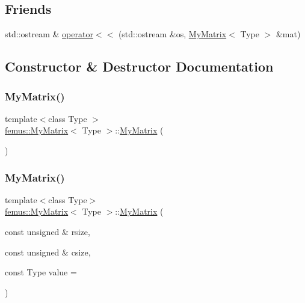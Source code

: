 \subsection*{Friends}
\begin{DoxyCompactItemize}
\item 
std\+::ostream \& \mbox{\hyperlink{classfemus_1_1_my_matrix_acdcbc06737c710ce4f4e823774acd345}{operator$<$$<$}} (std\+::ostream \&os, \mbox{\hyperlink{classfemus_1_1_my_matrix}{My\+Matrix}}$<$ Type $>$ \&mat)
\end{DoxyCompactItemize}


\subsection{Constructor \& Destructor Documentation}
\mbox{\label{classfemus_1_1_my_matrix_a1233f8df540f69758f079b3b932ff851}} 
\subsubsection{\texorpdfstring{My\+Matrix()}{MyMatrix()}\hspace{0.1cm}{\footnotesize\ttfamily [1/4]}}
{\footnotesize\ttfamily template$<$class Type $>$ \\
\mbox{\hyperlink{classfemus_1_1_my_matrix}{femus\+::\+My\+Matrix}}$<$ Type $>$\+::\mbox{\hyperlink{classfemus_1_1_my_matrix}{My\+Matrix}} (\begin{DoxyParamCaption}{ }\end{DoxyParamCaption})}

\mbox{\label{classfemus_1_1_my_matrix_a2ab151f14eac4d3c61504169435d2e52}} 
\subsubsection{\texorpdfstring{My\+Matrix()}{MyMatrix()}\hspace{0.1cm}{\footnotesize\ttfamily [2/4]}}
{\footnotesize\ttfamily template$<$class Type$>$ \\
\mbox{\hyperlink{classfemus_1_1_my_matrix}{femus\+::\+My\+Matrix}}$<$ Type $>$\+::\mbox{\hyperlink{classfemus_1_1_my_matrix}{My\+Matrix}} (\begin{DoxyParamCaption}\item[{const unsigned \&}]{rsize,  }\item[{const unsigned \&}]{csize,  }\item[{const Type}]{value = {} }\end{DoxyParamCaption})}

